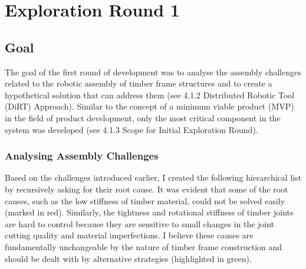 \chapter{Exploration Round 1}
\label{chapter:exploration_round_1}

\section{Goal}
\label{section:exploration_1_goal}

The goal of the first round of development was to analyse the assembly challenges related to the robotic assembly of timber frame structures and to create a hypothetical solution that can address them (see 4.1.2 Distributed Robotic Tool (DiRT) Approach). Similar to the concept of a minimum viable product (MVP) in the field of product development, only the most critical component in the system was developed (see 4.1.3 Scope for Initial Exploration Round).
\subsection{Analysing Assembly Challenges}
\label{subsection:exploration_1_analysing_assembly_challenges}

Based on the challenges introduced earlier, I created the following hierarchical list by recursively asking for their root cause. It was evident that some of the root causes, such as the low stiffness of timber material, could not be solved easily (marked in red). Similarly, the tightness and rotational stiffness of timber joints are hard to control because they are sensitive to small changes in the joint cutting quality and material imperfections. I believe these causes are fundamentally unchangeable by the nature of timber frame construction and should be dealt with by alternative strategies (highlighted in green). 


